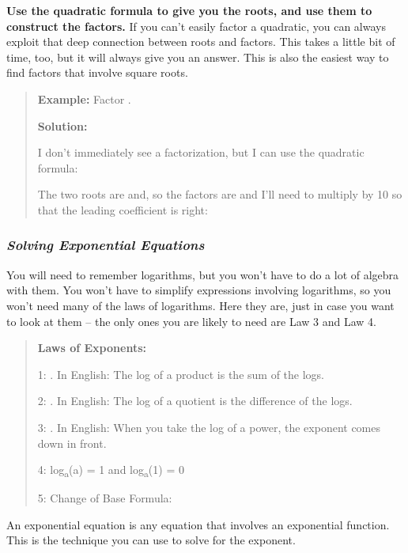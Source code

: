 \textbf{Use the quadratic formula to give you the roots, and use them to
construct the factors.} If you can't easily factor a quadratic, you can
always exploit that deep connection between roots and factors. This
takes a little bit of time, too, but it will always give you an answer.
This is also the easiest way to find factors that involve square roots.

\begin{quote}
\textbf{Example:} Factor .

\textbf{Solution:}

I don't immediately see a factorization, but I can use the quadratic
formula:

The two roots are and, so the factors are and I'll need to multiply by
10 so that the leading coefficient is right:
\end{quote}

\subsubsection{\texorpdfstring{\emph{\textbf{Solving Exponential
Equations}}}{Solving Exponential Equations}}\label{solving-exponential-equations}

You will need to remember logarithms, but you won't have to do a lot of
algebra with them. You won't have to simplify expressions involving
logarithms, so you won't need many of the laws of logarithms. Here they
are, just in case you want to look at them -- the only ones you are
likely to need are Law 3 and Law 4.

\begin{quote}
\textbf{Laws of Exponents:}

1: . In English: The log of a product is the sum of the logs.

2: . In English: The log of a quotient is the difference of the logs.

3: . In English: When you take the log of a power, the exponent comes
down in front.

4: log\textsubscript{a}(a) = 1 and log\textsubscript{a}(1) = 0

5: Change of Base Formula:
\end{quote}

An exponential equation is any equation that involves an exponential
function. This is the technique you can use to solve for the exponent.

